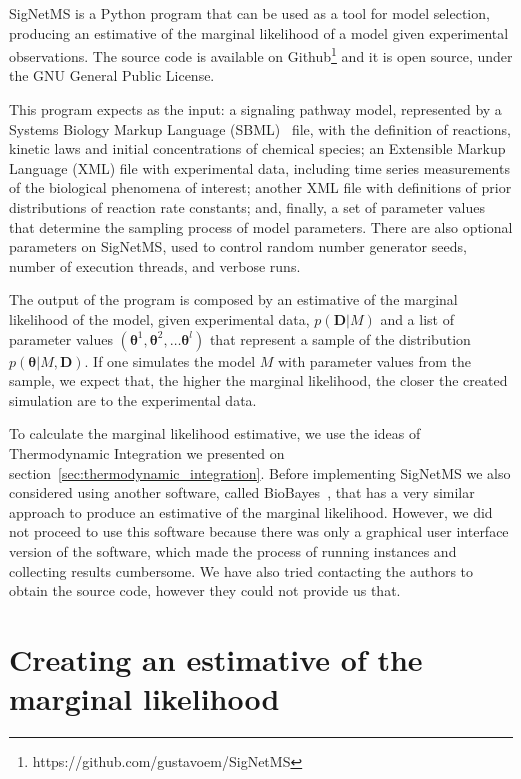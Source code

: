 SigNetMS is a Python program that can be used as a tool for model
selection, producing an estimative of the marginal likelihood of a model
given experimental observations. The source code is available on 
Github\footnote{https://github.com/gustavoem/SigNetMS} and it is open
source, under the GNU General Public License.

This program expects as the input: a signaling pathway model,
represented by a Systems Biology Markup Language
(SBML)~\cite{hucka2003systems} file, with the definition of reactions,
kinetic laws and initial concentrations of chemical species; an
Extensible Markup Language (XML) file with experimental data, including 
time series measurements of the  biological phenomena of interest;
another XML file with definitions of prior distributions of reaction
rate constants; and, finally, a set of parameter values that determine
the sampling process of model parameters. There are also optional
parameters on SigNetMS, used to control random number generator seeds,
number of execution threads, and verbose runs.

The output of the program is composed by an estimative of the marginal
likelihood of the model, given experimental data, $p({\bm D} | M)$ and a
list of parameter values $({\bm \theta}^1, {\bm \theta}^2, \ldots {\bm
\theta}^l)$ that represent a sample of the distribution $p({\bm \theta}
| M, {\bm D})$. If one simulates the model $M$ with parameter values
from the sample, we expect that, the higher the marginal likelihood, the
closer the created simulation are to the experimental data.

To calculate the marginal likelihood estimative, we use the ideas of 
Thermodynamic Integration we presented on 
section~\ref{sec:thermodynamic_integration}. Before implementing
SigNetMS we also considered using another software, called
BioBayes~\cite{Vyshemirsky2008}, that has a very similar approach to
produce an estimative of the marginal likelihood. However, we did not
proceed to use this software because there was only a graphical user
interface version of the software, which made the process of running
instances and collecting results cumbersome. We have also tried
contacting the authors to obtain the source code, however they could not
provide us that.

\section{Creating an estimative of the marginal likelihood}
\label{sec:creating_an_estimative_of_the_marginal_likelihood}


